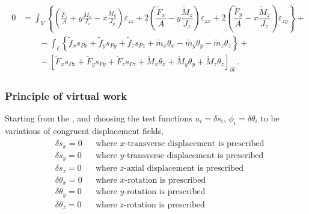\documentclass[letterpaper,10pt,english]{jupyterBook}
\begin{document}
\begin{equation*}
\begin{split}\begin{aligned}
 0 
 & = \int_V \left\{ \left( \frac{\widetilde{F}_z}{A} + y \frac{\widetilde{M}_x}{J_x} - x \frac{\widetilde{M}_y}{J_y} \right) \varepsilon_{zz} + 2 \left( \dfrac{\widetilde{F}_x}{A} - y \dfrac{\widetilde{M}_z}{J_z} \right) \varepsilon_{zx} + 2 \left( \dfrac{\widetilde{F}_y}{A} - x \dfrac{\widetilde{M}_z}{J_z} \right) \varepsilon_{zy} \right\} + \\
 & \qquad - \int_\ell \left\{ \widetilde{f}_x s_{Px} + \widetilde{f}_y s_{Py} + \widetilde{f}_z s_{Pz} + \widetilde{m}_x \theta_x - \widetilde{m}_y \theta_y - \widetilde{m}_z \theta_z \right\} + \\
 & \qquad - \left[ \widetilde{F}_x s_{Px} + \widetilde{F}_y s_{Py} + \widetilde{F}_z s_{Pz} + \widetilde{M}_x \theta_x + \widetilde{M}_y \theta_y + \widetilde{M}_z \theta_z \right]_{\partial l} \ .
\end{aligned}\end{split}
\end{equation*}

\subsubsection{Principle of virtual work}
\label{\detokenize{ch/solids/small-displacements-statics-beams-weak-form:principle-of-virtual-work}}\label{\detokenize{ch/solids/small-displacements-statics-beams-weak-form:solid-mechanics-intro-small-displacements-statics-beam-weak-form-weak-pvw}}
\sphinxAtStartPar
Starting from the {\hyperref[\detokenize{ch/solids/small-displacements-statics-beams-weak-form-general:solid-mechanics-intro-small-displacements-statics-beam-weak-form-weak-equilibrium}]{}}, and choosing the test functions \(u_i = \delta s_i\), \(\phi_i = \delta \theta_i\) to be variations of congruent displacement fields,
\begin{equation*}
\begin{split}\begin{aligned}
 & \delta s_x      = 0 && \text{where $x$-transverse displacement is prescribed} \\
 & \delta s_y      = 0 && \text{where $y$-transverse displacement is prescribed} \\
 & \delta s_z      = 0 && \text{where $z$-axial displacement is prescribed} \\
 & \delta \theta_x = 0 && \text{where $x$-rotation is prescribed} \\
 & \delta \theta_y = 0 && \text{where $y$-rotation is prescribed} \\
 & \delta \theta_z = 0 && \text{where $z$-rotation is prescribed} \\
\end{aligned}\end{split}
\end{equation*}
\end{document}
